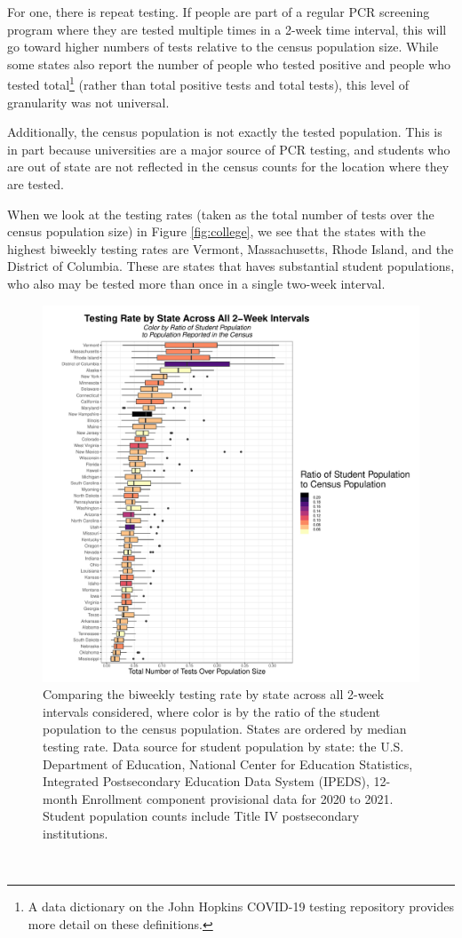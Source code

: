 \documentclass[12pt,twoside]{smiththesis}
\begin{document}
For one, there is repeat testing. If people are part of a regular PCR screening program where they are tested multiple times in a 2-week time interval, this will go toward higher numbers of tests relative to the census population size. While some states also report the number of people who tested positive and people who tested total\footnote{A data dictionary on the John Hopkins COVID-19 testing repository provides more detail on these definitions.} (rather than total positive tests and total tests), this level of granularity was not universal.

Additionally, the census population is not exactly the tested population. This is in part because universities are a major source of PCR testing, and students who are out of state are not reflected in the census counts for the location where they are tested.

When we look at the testing rates (taken as the total number of tests over the census population size) in Figure \ref{fig:college}, we see that the states with the highest biweekly testing rates are Vermont, Massachusetts, Rhode Island, and the District of Columbia. These are states that haves substantial student populations, who also may be tested more than once in a single two-week interval.
\begin{figure}
\includegraphics[width=1\linewidth]{figure/college_populations} \caption{\label{fig:college} Comparing the biweekly testing rate by state across all 2-week intervals considered,  where color is by the ratio of the student population to the census population. States are ordered by median testing rate. Data source for student population by state: the U.S. Department of Education, National Center for Education Statistics, Integrated Postsecondary Education Data System (IPEDS), 12-month Enrollment component provisional data for 2020 to 2021. Student population counts include Title IV postsecondary institutions.}\label{fig:unnamed-chunk-77}
\end{figure}
~
\end{document}
